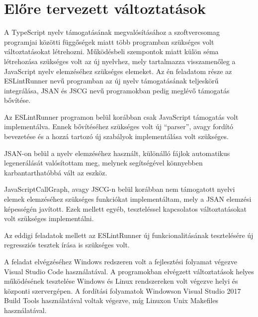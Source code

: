 \chapter{Előre tervezett változtatások}
\label{chap:fejezet3}


A TypeScript nyelv támogatásának megvalósításához a szoftvercsomag programjai közötti függőségek miatt több programban szükséges volt változtatásokat létrehozni.
Működésbeli szempontok miatt külön séma létrehozása szükséges volt az új nyelvhez, mely tartalmazza visszamenőleg a JavaScript nyelv elemzéséhez szükséges elemeket.
Az én feladatom része az ESLintRunner nevű programban az új nyelv támogatásának teljeskörű integrálása, JSAN és JSCG nevű programokban pedig meglévő támogatás bővítése.

Az ESLintRunner programon belül korábban csak JavaScript támogatás volt implementálva. Ennek bővítéséhez szükséges volt új ``parser'', avagy fordító bevezetése és a hozzá tartozó új szabályok implementálása volt szükséges.

JSAN-on belül a nyelv elemzéséhez használt, különálló fájlok automatikus legenerálását valósítottam meg, melynek segítségével könnyebben karbantarthatóbbá vált az eszköz.

JavaScriptCallGraph, avagy JSCG-n belül korábban nem támogatott nyelvi elemek elemzéséhez szükséges funkciókat implementáltam, mely a JSAN elemzési képességén javított.
Ezek mellett egyéb, teszteléssel kapcsolatos változtatásokat volt szükséges implementálni.

Az eddigi feladatok mellett az ESLintRunner új funkcionalitásának tesztelésére új regressziós tesztek írása is szükséges volt.

A feladat elvégzéséhez Windows redszeren volt a fejlesztési folyamat végezve Visual Studio Code használatával. A programokban elvégzett változtatások helyes működésének tesztelése Windows és Linux rendszereken volt végezve helyi és központi szervergépen. A fordítási folyamatok Windowson Visual Studio 2017 Build Tools használatával voltak végezve, míg Linuxon Unix Makefiles használatával.